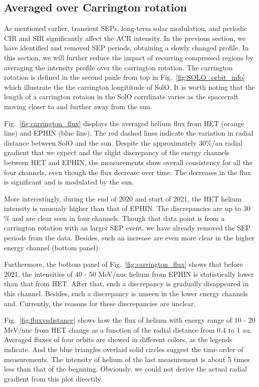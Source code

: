 \subsection*{Averaged over Carrington rotation}

As mentioned earlier, transient \acp{SEP}, long-term solar modulation, and periodic \ac{CIR} and \ac{SIR} significantly affect the \ac{ACR} intensity. In the previous section, we have identified and removed \ac{SEP} periods, obtaining a slowly changed profile. In this section, we will further reduce the impact of recurring compressed regions by averaging the intensity profile over the carrington rotation. The carrington rotation is defined in the second panle from top in Fig.~\ref{fig:SOLO_orbit_info} which illustrate the the carrington longititude of \ac{SolO}. It is worth noting that the length of a carrington rotaion in the \ac{SolO} corrdinate varies as the spacecraft moving closer to and further away from the sun. 

Fig.~\ref{fig:carrington_flux} displays the averaged helium flux from \ac{HET} (orange line) and \ac{EPHIN} (blue line). The red dashed lines indicate the variation in radial distance between \ac{SolO} and the sun. Despite the approximately 30\%/au radial gradient \citep{Rankin2021ApJ} that we expect and the slight discrepancy of the energy channels between \ac{HET} and \ac{EPHIN}, the measurements show overall consistency for all the four channels, even though the flux decrease over time. The decreases in the flux is significant and is modulated by the sun.

More interestingly, during the end of 2020 and start of 2021, the \ac{HET} helium intensity is unusualy higher than that of \ac{EPHIN}. The discrepancies are up to 30 \% and are clear seen in four channels. Though that data point is from a carrington rotation with an larger \ac{SEP} event, we have already removed the \ac{SEP} periods from the data. Besides, such an increase are even more clear in the higher energy channel (bottom panel). 

Furthermore, the bottom panel of Fig.~\ref{fig:carrington_flux} shows that before 2021, the intensities of 40 - 50 MeV/nuc helium from \ac{EPHIN} is statistically lower than that from \ac{HET}. After that, such a discrepancy is gradually disappeared in this channel. Besides, such a discrepancy is unseen in the lower energy channels and. Currently, the reasons for these discrepancise are unclear.

Fig.~\ref{fig:fluxvsdistance} shows how the flux of helium with energy range of 10 - 20 MeV/nuc from \ac{HET} change as a function of the radial distance from 0.4 to 1 au. Averaged fluxes of four orbits are showed in different colors, as the legends indicate. And the blue triangles overlaid solid circles suggest the time order of measurements. The intensity of helium of the last measurement is about 5 times less than that of the begnning. Obviously, we could not derive the actual radial gradient from this plot directily.


